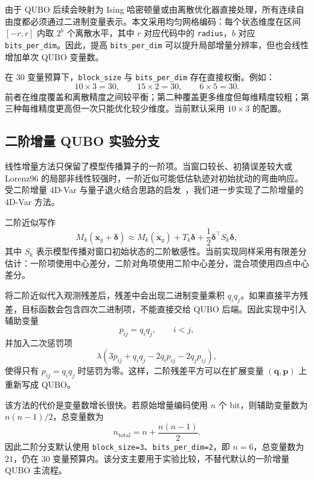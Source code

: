 \documentclass[UTF8,a4paper,12pt]{ctexart}
\begin{document}
由于 QUBO 后续会映射为 Ising 哈密顿量或由离散优化器直接处理，所有连续自由度都必须通过二进制变量表示。本文采用均匀网格编码：每个状态维度在区间 $[-r,r]$ 内取 $2^b$ 个离散水平，其中 $r$ 对应代码中的 \texttt{radius}，$b$ 对应 \texttt{bits\_per\_dim}。因此，提高 \texttt{bits\_per\_dim} 可以提升局部增量分辨率，但也会线性增加单次 QUBO 变量数。

在 30 变量预算下，\texttt{block\_size} 与 \texttt{bits\_per\_dim} 存在直接权衡。例如：
\begin{equation}
  10 \times 3 = 30,
  \qquad
  15 \times 2 = 30,
  \qquad
  6 \times 5 = 30.
\end{equation}
前者在维度覆盖和离散精度之间较平衡；第二种覆盖更多维度但每维精度较粗；第三种每维精度更高但一次只能优化较少维度。当前默认采用 $10 \times 3$ 的配置。

\subsection{二阶增量 QUBO 实验分支}

线性增量方法只保留了模型传播算子的一阶项。当窗口较长、初猜误差较大或 Lorenz96 的局部非线性较强时，一阶近似可能低估轨迹对初始扰动的弯曲响应。受二阶增量 4D-Var 与量子退火结合思路的启发~\cite{tsuyuki2025secondorder}，我们进一步实现了二阶增量的 4D-Var 方法。

二阶近似写作
\begin{equation}
  M_k(\bm{x}_g + \bm{\delta})
  \approx
  M_k(\bm{x}_g)
  + T_k \bm{\delta}
  + \frac{1}{2}
  \bm{\delta}^{\top} S_k \bm{\delta},
\end{equation}
其中 $S_k$ 表示模型传播对窗口初始状态的二阶敏感性。当前实现同样采用有限差分估计：一阶项使用中心差分，二阶对角项使用二阶中心差分，混合项使用四点中心差分。

将二阶近似代入观测残差后，残差中会出现二进制变量乘积 $q_i q_j$。如果直接平方残差，目标函数会包含四次二进制项，不能直接交给 QUBO 后端。因此实现中引入辅助变量
\begin{equation}
  p_{ij} = q_i q_j,
  \qquad i < j,
\end{equation}
并加入二次惩罚项
\begin{equation}
  \lambda
  \left(
    3p_{ij} + q_i q_j - 2q_i p_{ij} - 2q_j p_{ij}
  \right),
\end{equation}
使得只有 $p_{ij}=q_iq_j$ 时惩罚为零。这样，二阶残差平方可以在扩展变量 $(\bm{q},\bm{p})$ 上重新写成 QUBO。

该方法的代价是变量数增长很快。若原始增量编码使用 $n$ 个 bit，则辅助变量数为 $n(n-1)/2$，总变量数为
\begin{equation}
  n_{\mathrm{total}}
  =
  n + \frac{n(n-1)}{2}.
\end{equation}
因此二阶分支默认使用 \texttt{block\_size=3}、\texttt{bits\_per\_dim=2}，即 $n=6$，总变量数为 $21$，仍在 30 变量预算内。该分支主要用于实验比较，不替代默认的一阶增量 QUBO 主流程。
\end{document}
